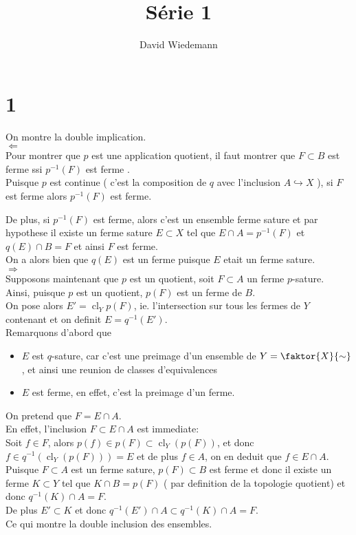 \documentclass[11pt, a4paper]{article}
\DeclareMathOperator{\cl}{cl}
\begin{document}
\title{Série 1}
\author{David Wiedemann}
\maketitle
\section*{1}
On montre la double implication.\\
$\Longleftarrow$\\
Pour montrer que $p$ est une application quotient, il faut montrer que $F \subset B$ est ferme ssi $p^{-1}( F) $ est ferme .\\
Puisque $p$ est continue ( c'est la composition de $q$ avec l'inclusion $ A \hookrightarrow X$ ), si $F$ est ferme alors $p^{-1}( F) $ est ferme.

De plus, si $p^{-1}( F) $ est ferme, alors c'est un ensemble ferme sature et par hypothese il existe un ferme sature $ E \subset X$ tel que $E\cap A = p^{-1}( F )$ et $q( E) \cap B = F$ et ainsi $F$ est ferme.\\
On a alors bien que $q( E) $ est un ferme puisque $E$ etait un ferme sature.\\
$\Longrightarrow$\\
Supposons maintenant que $p$ est un quotient, soit $ F \subset A$ un ferme $p$-sature.\\
Ainsi, puisque $p$ est un quotient, $p(F) $ est un ferme de $ B$.\\
On pose alors $E' = \cl_Y p( F)  $, ie. l'intersection sur tous les fermes de $Y$ contenant et on definit $ E= q^{-1}( E')$.\\
Remarquons d'abord que
\begin{itemize}
\item $E$ est $q$-sature, car c'est une preimage d'un ensemble de $Y= \faktor{X}{\sim}$  , et ainsi une reunion de classes d'equivalences
\item $E$ est ferme, en effet, c'est la preimage d'un ferme.
\end{itemize}

On pretend que $F = E\cap A$.\\
En effet, l'inclusion $ F \subset E \cap A$ est immediate:\\
Soit $f \in F$, alors $p( f) \in p( F) \subset \cl_Y( p( F) ) $, et donc $f\in q^{-1}( \cl_Y ( p( F) ) )= E $ et de plus $f \in A$, on en deduit que $f\in E\cap A$.\\
Puisque $F \subset A$ est un ferme sature, $p( F) \subset B$ est ferme et donc il existe un ferme $K \subset Y$ tel que $ K \cap B = p( F) $ ( par definition de la topologie quotient) et donc $ q^{-1}( K) \cap A = F$.\\
De plus $E' \subset K$ et donc $ q^{-1}( E') \cap A \subset q^{-1}( K) \cap A = F$.\\
Ce qui montre la double inclusion des ensembles.\\
\end{document}
